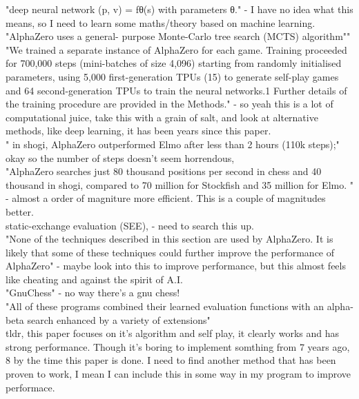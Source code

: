 \documentclass [12pt]{article}
\begin{document}
"deep neural network (p, v) = fθ(s) with parameters θ." - I have no idea what this means, so I need to learn some maths/theory based on machine learning.\\

"AlphaZero uses a general- purpose Monte-Carlo tree search (MCTS) algorithm""
\\

"We trained a separate instance of AlphaZero for each game. Training proceeded
for 700,000 steps (mini-batches of size 4,096) starting from randomly initialised parameters,
using 5,000 first-generation TPUs (15) to generate self-play games and 64 second-generation
TPUs to train the neural networks.1 Further details of the training procedure are provided in the
Methods." - so yeah this is a lot of computational juice, take this with a grain of salt, and look at alternative methods, like deep  learning, it has been years since this paper.\\ 

" in shogi, AlphaZero outperformed Elmo after less than 2 hours
(110k steps);" okay so the number of steps doesn't seem horrendous, \\ 


"AlphaZero searches just
80 thousand positions per second in chess and 40 thousand in shogi, compared to 70 million
for Stockfish and 35 million for Elmo. " - almost a order of magniture more efficient. This is a couple of magnitudes better. \\ 

 static-exchange evaluation (SEE), - need to search this up.\\ 

 "None of the techniques described in this section are used by AlphaZero. It is likely that
some of these techniques could further improve the performance of AlphaZero" - maybe look into this to improve performance, but this almost feels like cheating and against the spirit of A.I.\\ 

"GnuChess" - no way there's a gnu chess!\\


"All of these programs combined their learned evaluation functions with an alpha-beta search
enhanced by a variety of extensions"\\

tldr, this paper focuses on it's algorithm and self play, it clearly works and has strong performance. Though it's boring to implement somthing from 7 years ago, 8 by the time this paper is done. I need to find another method that has been proven to work, I mean I can include this in some way in my program to 
improve performace. \\ 
\end{document}

